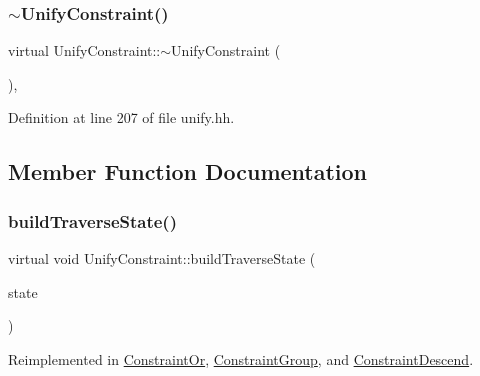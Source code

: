 \subsubsection{\texorpdfstring{$\sim$UnifyConstraint()}{~UnifyConstraint()}}
{\footnotesize\ttfamily virtual Unify\+Constraint\+::$\sim$\+Unify\+Constraint (\begin{DoxyParamCaption}\item[{void}]{ }\end{DoxyParamCaption})\hspace{0.3cm}{\ttfamily [inline]}, {\ttfamily [virtual]}}



Definition at line 207 of file unify.\+hh.



\subsection{Member Function Documentation}
\mbox{\label{class_unify_constraint_a5e1db6cd9dc1c2c22f6a98d5c1556e41}} 
\subsubsection{\texorpdfstring{buildTraverseState()}{buildTraverseState()}}
{\footnotesize\ttfamily virtual void Unify\+Constraint\+::build\+Traverse\+State (\begin{DoxyParamCaption}\item[{\mbox{\hyperlink{class_unify_state}{Unify\+State}} \&}]{state }\end{DoxyParamCaption})\hspace{0.3cm}{\ttfamily [virtual]}}



Reimplemented in \mbox{\hyperlink{class_constraint_or_a009ca281642d6e7949ee4b997f82e3df}{Constraint\+Or}}, \mbox{\hyperlink{class_constraint_group_a2dd52e0b06da735d9ce96f053dfb6bf2}{Constraint\+Group}}, and \mbox{\hyperlink{class_constraint_descend_a33fc5eaf61c61ab08d27dffe051dd2e6}{Constraint\+Descend}}.

\mbox{\label{class_unify_constraint_a4f068343932637d355644bb21559aa12}} 
